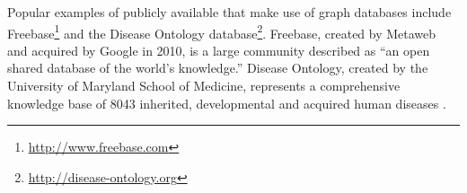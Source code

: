 Popular examples of publicly available \apps{} that make use of graph databases include Freebase\footnote{\href{http://www.freebase.com}{http://www.freebase.com}} and the Disease Ontology database\footnote{\href{http://disease-ontology.org}{http://disease-ontology.org}}. Freebase, created by Metaweb and acquired by Google in 2010, is a large community \md{} \db{} described as ``an open shared database of the world's knowledge.'' Disease Ontology, created by the University of Maryland School of Medicine, represents a comprehensive knowledge base of 8043 inherited, developmental and acquired human diseases \cite{schriml2012disease}.
